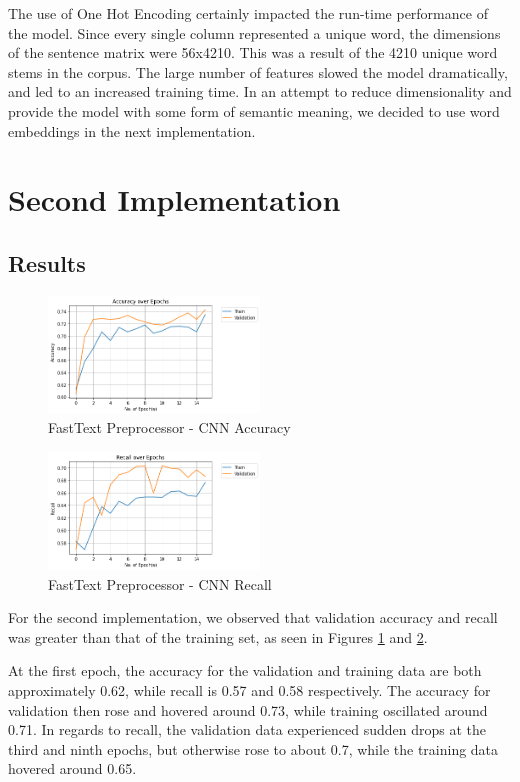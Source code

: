 \documentclass[12pt]{report}
\begin{document}
The use of One Hot Encoding certainly impacted the run-time performance of the model.
Since every single column represented a unique word, the dimensions of the sentence matrix
were 56x4210. This was a result of the 4210 unique word stems in the corpus. The large
number of features slowed the model dramatically, and led to an increased training time.
In an attempt to reduce dimensionality and provide the model with some form of semantic
meaning, we decided to use word embeddings in the next implementation.

\section{Second Implementation}

\subsection{Results}

\begin{figure}[H]
	\centering
	\includegraphics[width=0.5\textwidth]{accuracy-1.png}
	\caption{FastText Preprocessor - CNN Accuracy}
	\label{fig:ft-acc}
\end{figure}

\begin{figure}[H]
	\centering
	\includegraphics[width=0.5\textwidth]{recall-1.png}
	\caption{FastText Preprocessor - CNN Recall}
	\label{fig:ft-rec}
\end{figure}

For the second implementation, we observed that validation accuracy and
recall was greater than that of the training set, as seen in Figures \ref{fig:ft-acc} and
\ref{fig:ft-rec}.

At the first epoch, the accuracy for the validation and training data are both
approximately 0.62, while recall is 0.57 and 0.58 respectively. The accuracy
for validation then rose and hovered around 0.73, while training oscillated
around 0.71. In regards to recall, the validation data experienced sudden drops
at the third and ninth epochs, but otherwise rose to about 0.7, while the
training data hovered around 0.65.
\end{document}
